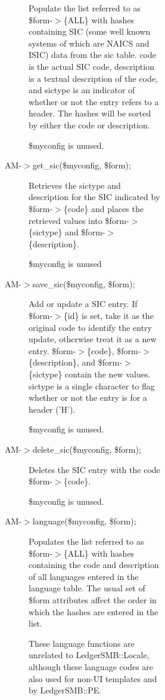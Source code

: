 \begin{description}
\begin{description}
\begin{description}
\begin{description}
\begin{description}
\begin{description}
\begin{description}
Populate the list referred to as \$form-$>$\{ALL\} with hashes containing SIC (some
well known systems of which are NAICS and ISIC) data from the sic table.  code
is the actual SIC code, description is a textual description of the code, and
sictype is an indicator of whether or not the entry refers to a header.  The
hashes will be sorted by either the code or description.



\$myconfig is unused.


\item[{AM-$>$get\_sic(\$myconfig, \$form);}] \mbox{}

Retrieves the sictype and description for the SIC indicated by
\$form-$>$\{code\} and places the retrieved values into \$form-$>$\{sictype\} and
\$form-$>$\{description\}.



\$myconfig is unused


\item[{AM-$>$save\_sic(\$myconfig, \$form);}] \mbox{}

Add or update a SIC entry.  If \$form-$>$\{id\} is set, take it as the original code
to identify the entry update, otherwise treat it as a new entry.  \$form-$>$\{code\},
\$form-$>$\{description\}, and \$form-$>$\{sictype\} contain the new values.  sictype is
a single character to flag whether or not the entry is for a header ('H').



\$myconfig is unused.


\item[{AM-$>$delete\_sic(\$myconfig, \$form);}] \mbox{}

Deletes the SIC entry with the code \$form-$>$\{code\}.



\$myconfig is unused.


\item[{AM-$>$language(\$myconfig, \$form);}] \mbox{}

Populates the list referred to as \$form-$>$\{ALL\} with hashes containing the code
and description of all languages entered in the language table.  The usual set
of \$form attributes affect the order in which the hashes are entered in the
list.



These language functions are unrelated to LedgerSMB::Locale, although these
language codes are also used for non-UI templates and by LedgerSMB::PE.




\end{description}
\end{description}
\end{description}
\end{description}
\end{description}
\end{description}
\end{description}
